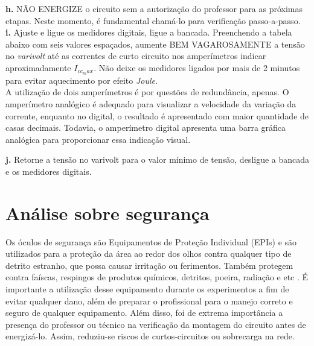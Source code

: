 \documentclass[a4paper,12pt,oneside,openany,table,xcdraw]{article}
\begin{document}
\noindent\textbf{h.} NÃO ENERGIZE o circuito sem a autorização do professor para as próximas etapas. Neste momento, é fundamental chamá-lo para verificação passo-a-passo. \\
\textbf{i.} Ajuste e ligue os medidores digitais, ligue a bancada. Preenchendo a tabela abaixo com seis valores espaçados, aumente BEM VAGAROSAMENTE a tensão no \textit{varivolt} até as correntes de curto circuito nos amperímetros indicar aproximadamente $I_{cc_max}$. Não deixe os medidores ligados por mais de 2 minutos para evitar aquecimento por efeito \textit{Joule}.  \\


A utilização de dois amperímetros é por questões de redundância, apenas. O amperímetro analógico é adequado para visualizar a velocidade da variação da corrente, enquanto no digital, o resultado é apresentado com maior quantidade de casas decimais. Todavia, o amperímetro digital apresenta uma barra gráfica analógica para proporcionar essa indicação visual. 

\textbf{j.} Retorne a tensão no varivolt para o valor mínimo de tensão, desligue a bancada e os medidores digitais.\\

\section{Análise sobre segurança} %
Os óculos de segurança são Equipamentos de Proteção Individual (EPIs) e são utilizados para a proteção da área ao redor dos olhos contra qualquer tipo de detrito estranho, que possa causar irritação ou ferimentos. Também protegem contra faíscas, respingos de produtos químicos, detritos, poeira, radiação e etc \cite{safe}.
É importante a utilização desse equipamento durante os experimentos a fim de evitar qualquer dano, além de preparar o profissional para o manejo correto e seguro de qualquer equipamento.
Além disso, foi de extrema importância a presença do professor ou técnico na verificação da montagem do circuito antes de energizá-lo. Assim, reduziu-se riscos de curtos-circuitos ou sobrecarga na rede.
\end{document}
